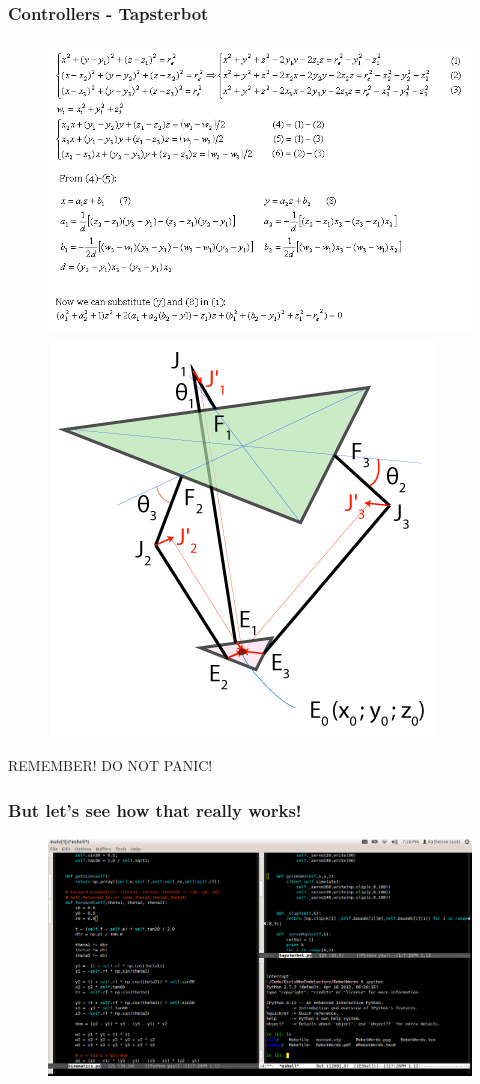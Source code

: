 \documentclass[compress]{beamer}
\begin{document}
\begin{frame}
  \frametitle{Controllers - Tapsterbot}
  \begin{figure}
     \includegraphics[width=0.4\linewidth]{deltamath.png}
     \quad
    \includegraphics[width=0.4\linewidth]{delta.png}
  \end{figure}
 REMEMBER! DO NOT PANIC!
 \end{frame}
\begin{frame}
  \frametitle{But let's see how that really works!}
  \begin{figure}
     \includegraphics[width=0.8\linewidth]{emacs.png}
   \end{figure}
 \end{frame}
\end{document}
